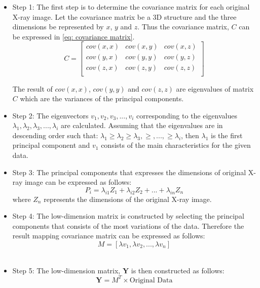 \documentclass[11pt]{article}
\begin{document}
	\begin{itemize}
		\item Step 1: The first step is to determine the covariance matrix for each original X-ray image. Let the covariance matrix be a 3D structure and the three dimensions be represented by $x$, $y$ and $z$. Thus the covariance matrix, $C$ can be expressed in \eqref{eq: covariance matrix}.
		\begin{equation}
		\label{eq: covariance matrix}
		C = 
		\begin{bmatrix}
		cov(x,x) & cov(x,y) & cov(x,z) \\
		cov(y,x) & cov(y,y) & cov(y,z) \\
		cov(z,x) & cov(z,y) & cov(z,z) \\
		\end{bmatrix}
		\end{equation}
		
		The result of $cov(x,x)$, $cov(y,y)$ and $cov(z,z)$ are eigenvalues of matrix $C$ which are the variances of the principal components.\\
		\item Step 2: The eigenvectors $v_1, v_2, v_3, ... , v_i$ corresponding to the eigenvalues \newline $\lambda_1, \lambda_2, \lambda_3, ... , \lambda_i$ are calculated. Assuming that the eigenvalues are in descending order such that: $\lambda_1 \geq \lambda_2 \geq \lambda_3, \geq, ...,\geq \lambda_i$, then $\lambda_1$ is the first principal component and $v_1$ consists of the main characteristics for the given data. \\
		\item Step 3: The principal components that expresses the dimensions of original X-ray image can be expressed as follows:
		\begin{equation}
		P_i = \lambda_{i1}Z_1 + \lambda_{i2}Z_2 + ... + \lambda_{in}Z_n
		\end{equation} 
		where $Z_n$ represents the dimensions of the original X-ray image. \\
		\item Step 4: The low-dimension matrix is constructed by selecting the principal components that consists of the most variations of the data. Therefore the result mapping covariance matrix can be expressed as follows: 
		\begin{equation}
		M = [\lambda v_1, \lambda v_2, ... , \lambda v_n]
		\end{equation} \\
		\item Step 5: The low-dimension matrix, $\textbf{Y}$ is then constructed as follows:
		\begin{equation}
		\textbf{Y} = M^T \times \text{Original Data}
		\end{equation}
	\end{itemize}
	
\end{document}
